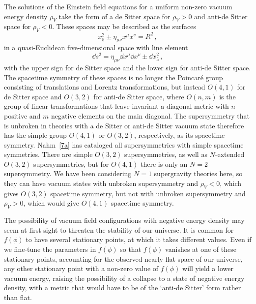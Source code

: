 The solutions of the Einstein field equations for a uniform non-zero vacuum
energy density \(\rho_V\) take the form of a de Sitter space for
\(\rho_V>0\) and anti-de Sitter space for \(\rho_V<0\). These spaces may be
described as the surfaces
\begin{equation}
  x_5^2\mathbin{\pm}\eta_{\mu\nu}x^\mu x^\nu=R^2\,,
  \tag{31.2.21}\label{eq:31.2.21}
\end{equation}
in a quasi-Euclidean five-dimensional space with line element
\begin{equation}
  \dd s^2=\eta_{\mu\nu}\dd x^\mu \dd x^\nu\mathbin{\pm}\dd x_5^2\,,
  \tag{31.2.22}\label{eq:31.2.22}
\end{equation}
with the upper sign for de Sitter space and the lower sign for anti-de Sitter
space. The spacetime symmetry of these spaces is no longer the Poincaré group
consisting of translations and Lorentz transformations, but instead \(O(4,1)\)
for de Sitter space and \(O(3,2)\) for anti-de Sitter space, where \(O(n,m)\)
is the group of linear transformations that leave invariant a diagonal metric
with \(n\) positive and \(m\) negative elements on the main diagonal. The
supersymmetry that is unbroken in theories with a de Sitter or anti-de Sitter
vacuum state therefore has the simple group \(O(4,1)\) or \(O(3,2)\),
respectively, as its spacetime symmetry. Nahm~\hyperref[ch31-ref-7a]{[7a]} has
cataloged all supersymmetries with simple spacetime symmetries. There are
simple \(O(3,2)\) supersymmetries, as well as \(N\)-extended \(O(3,2)\)
supersymmetries, but for \(O(4,1)\) there is only an \(N=2\) supersymmetry. We
have been considering \(N=1\) supergravity theories here, so they can have
vacuum states with unbroken supersymmetry and \(\rho_V<0\), which gives
\(O(3,2)\) spacetime symmetry, but not with unbroken supersymmetry and
\(\rho_V>0\), which would give \(O(4,1)\) spacetime symmetry.

The possibility of vacuum field configurations with negative energy density
may seem at first sight to threaten the stability of our universe. It is
common for \(f(\phi)\) to have several stationary points, at which it takes
different values. Even if we fine-tune the parameters in \(f(\phi)\) so that
\(f(\phi)\) vanishes at one of these stationary points, accounting for the
observed nearly flat space of our universe, any other stationary point with a
non-zero value of \(f(\phi)\) will yield a lower vacuum energy, raising the
possibility of a collapse to a state of negative energy density, with a metric
that would have to be of the `anti-de Sitter' form rather than flat.

